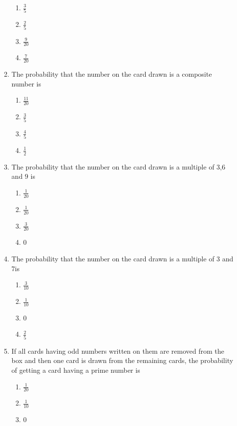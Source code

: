 \begin{enumerate}
\begin{enumerate}
\begin{enumerate}
          \item $\frac{3}{5}$
          \item $\frac{2}{5}$
          \item $\frac{9}{20}$                      
          \item $\frac{7}{20}$                                               \end{enumerate}
\item The probability that the number on the card drawn is a composite number is
\begin{enumerate}
        \item $\frac{11}{20}$                     
	\item $\frac{3}{5}$                       
	\item $\frac{4}{5}$                     
	\item $\frac{1}{2}$
\end{enumerate}
\item The probability that the number on the card drawn is a multiple of $3$,$6$ and $9$ is
\begin{enumerate}               
	\item $\frac{1}{20}$                      
	\item $\frac{1}{20}$                      
	\item $\frac{3}{20}$                      
	\item $0$
\end{enumerate}
\item The probability that the number on the card drawn is a multiple of $3$ and $7$is
\begin{enumerate}                 
	\item $\frac{3}{10}$                      
	\item $\frac{1}{10}$                      
	\item $0$
        \item $\frac{2}{5}$               
\end{enumerate}                                                              \item If all cards having odd numbers written on them are removed from the box and then one card is drawn from the remaining cards, the probability of getting a card having a prime number is
\begin{enumerate}                
	\item $\frac{1}{20}$
	\item $\frac{1}{10}$                      
        \item $0$ 

\end{enumerate}
\end{enumerate}
\end{enumerate}

